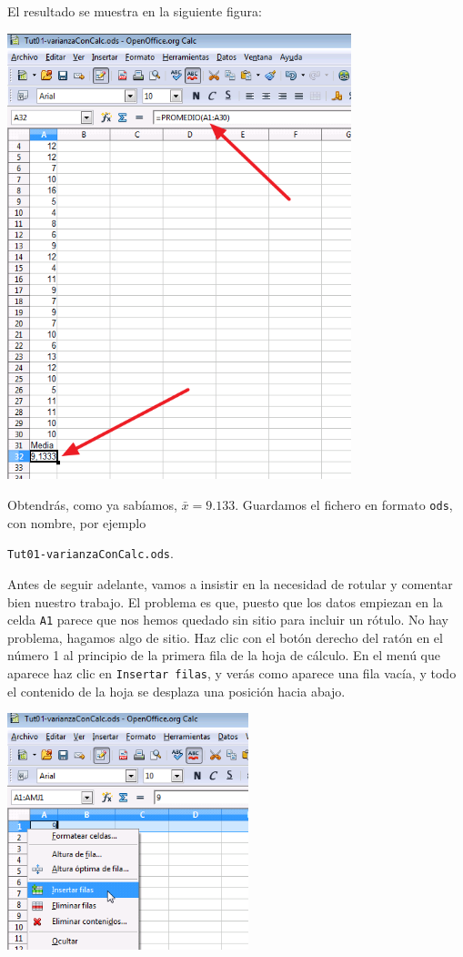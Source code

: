 \documentclass[10pt,a4paper]{article}\usepackage[]{graphicx}\usepackage[]{color}
\newcounter {cont01}
\begin{document}
\newpage

El resultado se muestra en la siguiente figura:
    \begin{center}
    \includegraphics[width=10cm]{../fig/Tut02-45.png}
    \end{center}
Obtendrás, como ya sabíamos, $\bar x=9.133$.  Guardamos el fichero en formato {\tt ods}, con nombre, por ejemplo
\begin{center}
{\tt Tut01-varianzaConCalc.ods}\label{tut01:fichero:Tut01-varianzaConCalc.ods}.
\end{center}
Antes de seguir adelante, vamos a insistir en la necesidad de rotular y comentar bien nuestro trabajo. El problema es que, puesto que los datos empiezan en la celda {\tt A1} parece que nos hemos quedado sin sitio para incluir un rótulo. No hay problema, hagamos algo de sitio. Haz clic con el botón derecho del ratón en el número 1 al principio de la primera fila de la hoja de cálculo. En el menú que aparece haz clic en {\tt Insertar filas}, y verás como aparece una fila vacía, y todo el contenido de la hoja se desplaza una posición hacia abajo.
    \begin{center}
    \includegraphics[width=7cm]{../fig/Tut02-46.png}
    \end{center}
\end{document}
